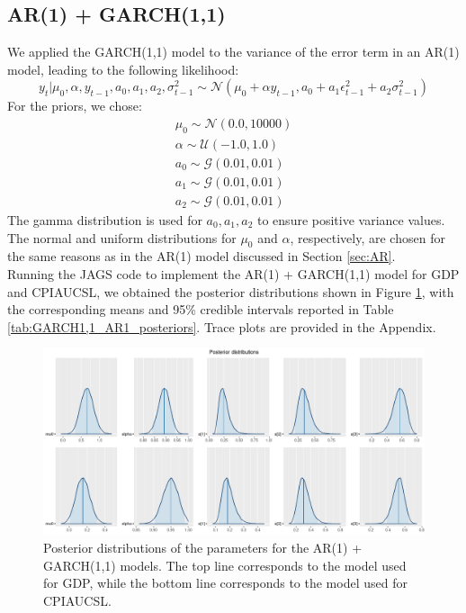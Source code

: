 \subsection*{AR(1) + GARCH(1,1)}
We applied the GARCH(1,1) model to the variance of the error term in an AR(1) model, leading to the following likelihood:
\begin{equation}
    \label{eq:GARCH1,1_likelihood}
    y_{t}|\mu_{0},\alpha,y_{t-1},a_0,a_1,a_2,\sigma^2_{t-1} \sim \mathcal{N}(\mu_{0} + \alpha y_{t-1}, a_0 + a_1 \epsilon^2_{t-1} + a_2 \sigma^2_{t-1})
\end{equation}
For the priors, we chose:
\begin{equation}
    \label{eq:GARCH1,1_priors}
    \begin{split}
        \mu_0 \sim \mathcal{N}(0.0, 10000) \\
        \alpha \sim \mathcal{U}(-1.0, 1.0) \\
        a_0 \sim \mathcal{G}(0.01, 0.01) \\
        a_1 \sim \mathcal{G}(0.01, 0.01) \\
        a_2 \sim \mathcal{G}(0.01, 0.01)
    \end{split}
\end{equation}
The gamma distribution is used for $a_0, a_1, a_2$ to ensure positive variance values. The normal and uniform distributions for $\mu_{0}$ and $\alpha$, respectively, are chosen for the same reasons as in the AR(1) model discussed in Section \ref{sec:AR}. \\
Running the JAGS code to implement the AR(1) + GARCH(1,1) model for GDP and CPIAUCSL, we obtained the posterior distributions shown in Figure \ref{fig:GARCH1,1_AR1_posteriors}, with the corresponding means and 95\% credible intervals reported in Table \ref{tab:GARCH1,1_AR1_posteriors}. Trace plots are provided in the Appendix. \\
\begin{figure}[H]
    \centering
    \includegraphics[width=\textwidth]{images/5-GARCH/posteriors.png}
    \caption{Posterior distributions of the parameters for the AR(1) + GARCH(1,1) models. The top line corresponds to the model used for GDP, while the bottom line corresponds to the model used for CPIAUCSL.}
    \label{fig:GARCH1,1_AR1_posteriors}
\end{figure}
